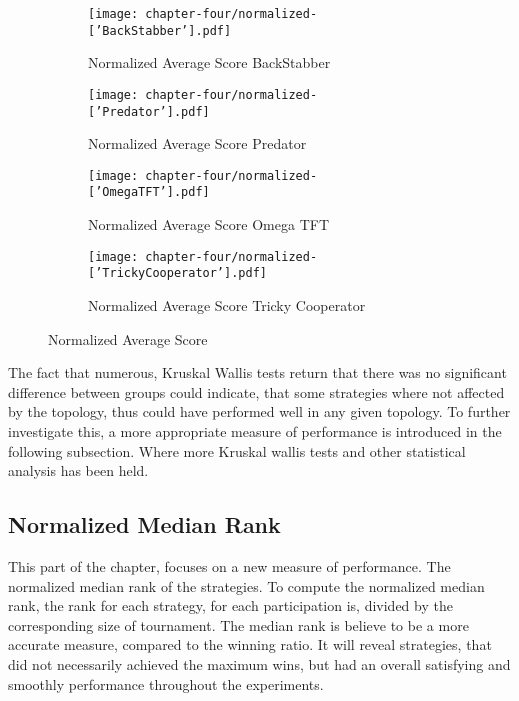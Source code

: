 \begin{figure}[!hbtp]
	\centering
	\begin{subfigure}[t]{0.70\textwidth}
		\centering
		\texttt{[image: chapter-four/normalized-['BackStabber'].pdf]}
		\caption{Normalized Average Score BackStabber}
	\end{subfigure}
	\hfill
	\begin{subfigure}[t]{0.70\textwidth}\centering
		\centering
		\texttt{[image: chapter-four/normalized-['Predator'].pdf]}
		\caption{Normalized Average Score Predator}
	\end{subfigure}
	\hfill
	\begin{subfigure}[t]{0.70\textwidth}\centering
		\centering
		\texttt{[image: chapter-four/normalized-['OmegaTFT'].pdf]}
		\caption{Normalized Average Score Omega TFT}
	\end{subfigure}
	\hfill
	\begin{subfigure}[t]{0.70\textwidth}\centering
		\centering
		\texttt{[image: chapter-four/normalized-['TrickyCooperator'].pdf]}
		\caption{Normalized Average Score Tricky Cooperator}
	\end{subfigure}
	\caption{Normalized Average Score}
	\label{normalized-av-scr}
\end{figure}

The fact that numerous, Kruskal Wallis tests return that there was no significant
difference between groups could indicate, that some strategies where not affected
by the topology, thus could have performed well in any given topology.
To further investigate this, a more appropriate measure of performance is
introduced in the following subsection. Where more Kruskal wallis tests and
other statistical analysis has been held.

\subsection{Normalized Median Rank}

This part of the chapter, focuses on a new measure of performance. The
normalized median rank of the strategies. To compute the normalized median rank,
the rank for each strategy, for each participation is, divided by the corresponding
size of tournament. The median rank is believe to be a more accurate measure,
compared to the winning ratio. It will reveal strategies, that did not necessarily
achieved the maximum wins, but had an overall satisfying and smoothly
performance throughout the experiments.

